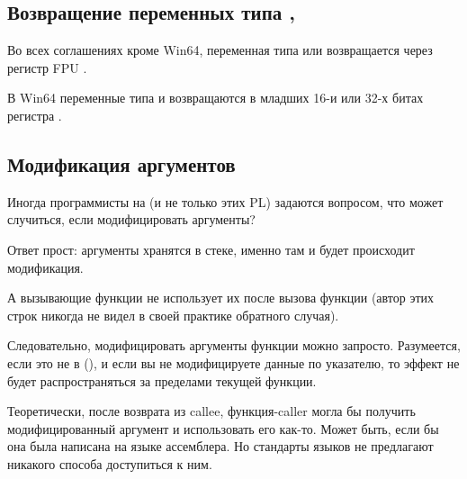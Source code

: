\subsection{Возвращение переменных типа \Tfloat, \Tdouble}

Во всех соглашениях кроме Win64, переменная типа \Tfloat или \Tdouble возвращается через регистр FPU .

В Win64 переменные типа \Tfloat и \Tdouble возвращаются в младших 16-и или 32-х битах 
регистра .

\subsection{Модификация аргументов}

Иногда программисты на \CCpp{} (и не только этих \ac{PL}) задаются вопросом,
что может случиться, если модифицировать аргументы?

Ответ прост: аргументы хранятся в стеке, именно там и будет происходит модификация.

А вызывающие функции не использует их после вызова функции (автор этих строк никогда не видел в своей практике обратного случая).






Следовательно, модифицировать аргументы функции можно запросто.
Разумеется, если это не  в \Cpp{} (),
и если вы не модифицируете данные по указателю, 
то эффект не будет распространяться за пределами текущей функции.

Теоретически, после возврата из \gls{callee},
функция-\gls{caller} могла бы получить модифицированный аргумент и использовать его как-то.
Может быть, если бы она была написана на языке ассемблера.
Но стандарты языков \CCpp не предлагают никакого способа доступиться к ним.



